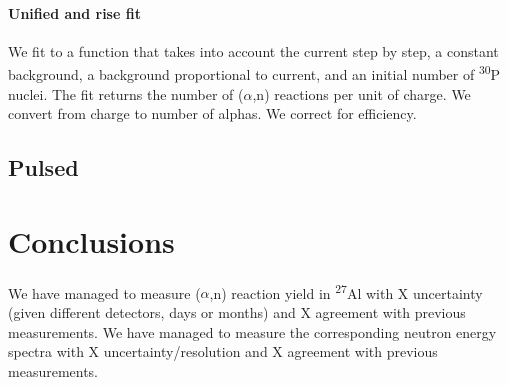 \documentclass[a4paper,12pt]{report}
\newcommand{\an}{($\alpha$,n) }
\newcommand{\Aliso}{\textsuperscript{27}Al }
\newcommand{\Piso}{\textsuperscript{30}P }
\begin{document}
\subsubsection{Unified and rise fit}
We fit to a function that takes into account the current step by step, a constant background, a background proportional to current, and an initial number of \Piso nuclei.
The fit returns the number of \an reactions per unit of charge.
We convert from charge to number of alphas.
We correct for efficiency.


\section{Pulsed}


\chapter{Conclusions}
We have managed to measure \an reaction yield in \Aliso with X uncertainty (given different detectors, days or months) and X agreement with previous measurements.
We have managed to measure the corresponding neutron energy spectra with X uncertainty/resolution and X agreement with previous measurements.
\end{document}
